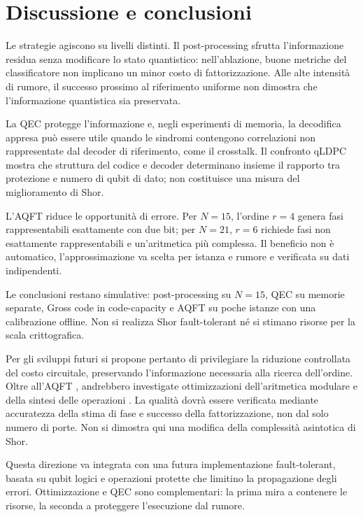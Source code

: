 \section{Discussione e conclusioni}

Le strategie agiscono su livelli distinti. Il post-processing sfrutta l'informazione residua
senza modificare lo stato quantistico: nell'ablazione, buone metriche del classificatore non
implicano un minor costo di fattorizzazione. Alle alte intensità di rumore, il successo
prossimo al riferimento uniforme non dimostra che l'informazione quantistica sia preservata.

La QEC protegge l'informazione e, negli esperimenti di memoria, la decodifica appresa può
essere utile quando le sindromi contengono correlazioni non rappresentate dal decoder di
riferimento, come il crosstalk. Il confronto qLDPC mostra che struttura del codice e decoder
determinano insieme il rapporto tra protezione e numero di qubit di dato; non costituisce una
misura del miglioramento di Shor.

L'AQFT riduce le opportunità di errore. Per \(N = 15\), l'ordine \(r = 4\) genera fasi
rappresentabili esattamente con due bit; per \(N = 21\), \(r = 6\) richiede fasi non
esattamente rappresentabili e un'aritmetica più complessa. Il beneficio non è automatico,
l'approssimazione va scelta per istanza e rumore e verificata su dati indipendenti.

Le conclusioni restano simulative: post-processing su \(N = 15\), QEC su memorie separate,
Gross code in code-capacity e AQFT su poche istanze con una calibrazione offline. Non si
realizza Shor fault-tolerant né si stimano risorse per la scala crittografica.

Per gli sviluppi futuri si propone pertanto di privilegiare la riduzione controllata del costo
circuitale, preservando l'informazione necessaria alla ricerca dell'ordine. Oltre all'AQFT
\cite{barencoAQFT1996}, andrebbero investigate ottimizzazioni dell'aritmetica modulare e della
sintesi delle operazioni \cite{gidney2021}. La qualità dovrà essere verificata mediante
accuratezza della stima di fase e successo della fattorizzazione, non dal solo numero di porte.
Non si dimostra qui una modifica della complessità asintotica di Shor.

Questa direzione va integrata con una futura implementazione fault-tolerant, basata su qubit
logici e operazioni protette che limitino la propagazione degli errori. Ottimizzazione e QEC
sono complementari: la prima mira a contenere le risorse, la seconda a proteggere l'esecuzione
dal rumore.
